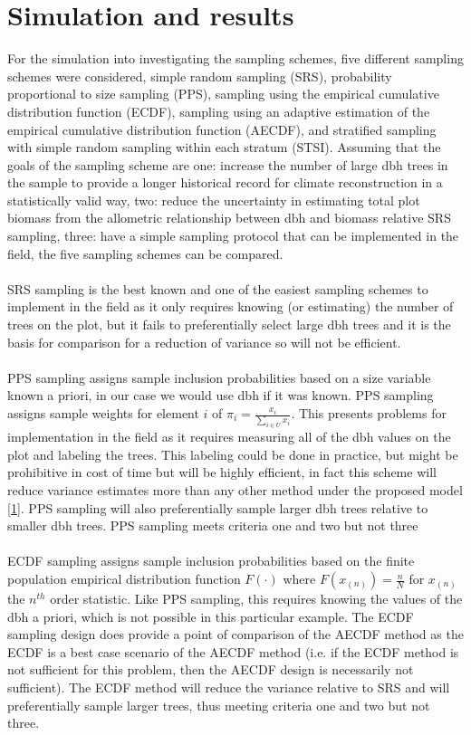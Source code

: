\documentclass[fleqn]{article}
\begin{document}
\section{Simulation and results}
%
For the simulation into investigating the sampling schemes, five different sampling schemes were considered, simple random sampling (SRS), probability proportional to size sampling (PPS), sampling using the empirical cumulative distribution function (ECDF), sampling using an adaptive estimation of the empirical cumulative distribution function (AECDF), and stratified sampling with simple random sampling within each stratum (STSI). Assuming that the goals of the sampling scheme are one: increase the number of large dbh trees in the sample to provide a longer historical record for climate reconstruction in a statistically valid way, two: reduce the uncertainty in estimating total plot biomass from the allometric relationship between dbh and biomass relative SRS sampling, three: have a simple sampling protocol that can be implemented in the field, the five sampling schemes can be compared.\\
\\
SRS sampling is the best known and one of the easiest sampling schemes to implement in the field as it only requires knowing (or estimating) the number of trees on the plot, but it fails to preferentially select large dbh trees and it is the basis for comparison for a reduction of variance so will not be efficient.\\
\\
PPS sampling assigns sample inclusion probabilities based on a size variable known a priori, in our case we would use dbh if it was known. PPS sampling assigns sample weights for element $i$ of $\pi_i = \frac{x_i} {\sum_{i \in U} x_i}$. This presents problems for implementation in the field as it requires measuring all of the dbh values on the plot and labeling the trees. This labeling could be done in practice, but might be prohibitive in cost of time but will be highly efficient, in fact this scheme will reduce variance estimates more than any other method under the proposed model \eqref{1}. PPS sampling will also preferentially sample larger dbh trees relative to smaller dbh trees. PPS sampling meets criteria one and two but not three\\
\\
ECDF sampling assigns sample inclusion probabilities based on the finite population empirical distribution function $F(\cdot)$ where $F(x_{(n)}) = \frac{n} {N}$ for $x_{(n)}$ the $n^{th}$ order statistic. Like PPS sampling, this requires knowing the values of the dbh a priori, which is not possible in this particular example. The ECDF sampling design does provide a point of comparison of the AECDF method as the ECDF is a best case scenario of the AECDF method (i.e. if the ECDF method is not sufficient for this problem, then the AECDF design is necessarily not sufficient). The ECDF method will reduce the variance relative to SRS and will preferentially sample larger trees, thus meeting criteria one and two but not three.\\
\end{document}
